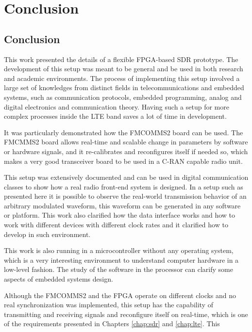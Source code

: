 \chapter{Conclusion}
\label{chap:conclusion}

\section{Conclusion}
\label{sec:conclusion}

This work presented the details of a flexible FPGA-based SDR prototype. The
development of this setup was meant to be general and be used in both research
and academic environments. The process of implementing this setup involved a
large set of knowledges from distinct fields in telecommunications and embedded
systems, such as communication protocols, embedded programming, analog and
digital electronics and communication theory. Having such a setup for more
complex processes inside the LTE band saves a lot of time in development.

It was particularly demonstrated how the FMCOMMS2 board can be used. The FMCMMS2
board allows real-time and scalable change in parameters by software or hardware
signals, and it re-calibrates and reconfigures itself if needed so, which makes
a very good transceiver board to be used in a C-RAN capable radio unit.

This setup was extensively documented and can be used in digital communication
classes to show how a real radio front-end system is designed. In a setup such
as presented here it is possible to observe the real-world transmission behavior
of an arbitrary modulated waveform, this waveform can be generated in any
software or platform. This work also clarified how the data interface works and
how to work with different devices with different clock rates and it clarified
how to develop in such environment.

This work is also running in a microcontroller without any operating system,
which is a very interesting environment to understand computer hardware in a
low-level fashion. The study of the software in the processor can clarify some
aspects of embedded systems design.

Although the FMCOMMS2 and the FPGA operate on different clocks and no real
synchronization was implemented, this setup has the capability of transmitting
and receiving signals and reconfigure itself on real-time, which is one of the
requirements presented in Chapters \ref{chap:sdr} and \ref{chap:lte}. This

